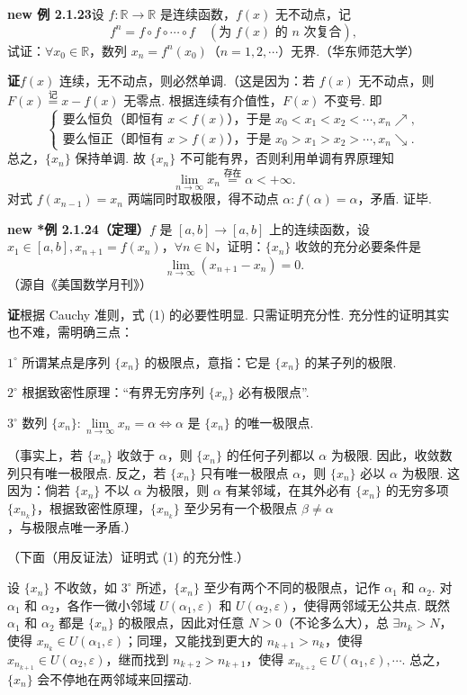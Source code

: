 \documentclass[UTF8,12pt,a4paper,fontset=fandol]{ctexart}
\begin{document}
\noindent\textbf{new 例 2.1.23}\quad 设 $f:\mathbb{R}\to\mathbb{R}$ 是连续函数，$f(x)$ 无不动点，记
\[
  f^n=f\circ f\circ\cdots\circ f\quad(\text{为 }f(x)\text{ 的 }n\text{ 次复合}),
\]
试证：$\forall x_0\in\mathbb{R}$，数列 $x_n=f^n(x_0)$（$n=1,2,\cdots$）无界.（华东师范大学）

\noindent\textbf{证}\quad $f(x)$ 连续，无不动点，则必然单调.（这是因为：若 $f(x)$ 无不动点，则 $F(x)\overset{\text{记}}=x-f(x)$ 无零点. 根据连续有介值性，$F(x)$ 不变号. 即
\[
  \begin{cases}
    \text{要么恒负（即恒有 }x<f(x)\text{），于是 }x_0<x_1<x_2<\cdots,x_n\nearrow,\\
    \text{要么恒正（即恒有 }x>f(x)\text{），于是 }x_0>x_1>x_2>\cdots,x_n\searrow.
  \end{cases}
\]
总之，$\{x_n\}$ 保持单调. 故 $\{x_n\}$ 不可能有界，否则利用单调有界原理知
\[
  \lim_{n\to\infty}x_n\overset{\text{存在}}=\alpha<+\infty.
\]
对式 $f(x_{n-1})=x_n$ 两端同时取极限，得不动点 $\alpha:f(\alpha)=\alpha$，矛盾. 证毕.

\noindent\textbf{new *例 2.1.24（定理）}\quad $f$ 是 $[a,b]\to[a,b]$ 上的连续函数，设 $x_1\in[a,b],x_{n+1}=f(x_n)$，$\forall n\in\mathbb{N}$，证明：$\{x_n\}$ 收敛的充分必要条件是
\[
  \lim_{n\to\infty}(x_{n+1}-x_n)=0.
\tag{1}
\]
（源自《美国数学月刊》）

\noindent\textbf{证}\quad 根据 Cauchy 准则，式 (1) 的必要性明显. 只需证明充分性. 充分性的证明其实也不难，需明确三点：

$1^\circ$ 所谓某点是序列 $\{x_n\}$ 的极限点，意指：它是 $\{x_n\}$ 的某子列的极限.

$2^\circ$ 根据致密性原理：“有界无穷序列 $\{x_n\}$ 必有极限点”.

$3^\circ$ 数列 $\{x_n\}:\lim\limits_{n\to\infty}x_n=\alpha\Leftrightarrow\alpha$ 是 $\{x_n\}$ 的唯一极限点.

（事实上，若 $\{x_n\}$ 收敛于 $\alpha$，则 $\{x_n\}$ 的任何子列都以 $\alpha$ 为极限. 因此，收敛数列只有唯一极限点. 反之，若 $\{x_n\}$ 只有唯一极限点 $\alpha$，则 $\{x_n\}$ 必以 $\alpha$ 为极限. 这因为：倘若 $\{x_n\}$ 不以 $\alpha$ 为极限，则 $\alpha$ 有某邻域，在其外必有 $\{x_n\}$ 的无穷多项 $\{x_{n_k}\}$，根据致密性原理，$\{x_{n_k}\}$ 至少另有一个极限点 $\beta\ne\alpha$，与极限点唯一矛盾.）

（下面（用反证法）证明式 (1) 的充分性.）

设 $\{x_n\}$ 不收敛，如 $3^\circ$ 所述，$\{x_n\}$ 至少有两个不同的极限点，记作 $\alpha_1$ 和 $\alpha_2$. 对 $\alpha_1$ 和 $\alpha_2$，各作一微小邻域 $U(\alpha_1,\varepsilon)$ 和 $U(\alpha_2,\varepsilon)$，使得两邻域无公共点. 既然 $\alpha_1$ 和 $\alpha_2$ 都是 $\{x_n\}$ 的极限点，因此对任意 $N>0$（不论多么大），总 $\exists n_k>N$，使得 $x_{n_k}\in U(\alpha_1,\varepsilon)$；同理，又能找到更大的 $n_{k+1}>n_k$，使得 $x_{n_{k+1}}\in U(\alpha_2,\varepsilon)$，继而找到 $n_{k+2}>n_{k+1}$，使得 $x_{n_{k+2}}\in U(\alpha_1,\varepsilon),\cdots$. 总之，$\{x_n\}$ 会不停地在两邻域来回摆动.
\end{document}
